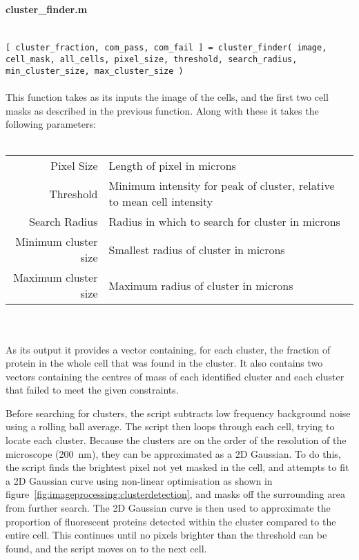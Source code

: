 \documentclass[../main.tex]{subfiles}
\begin{document}
\paragraph{cluster\_finder.m}\ \\
\texttt{[ cluster\_fraction, com\_pass, com\_fail ] = cluster\_finder( image, cell\_mask, all\_cells, pixel\_size, threshold, search\_radius, min\_cluster\_size, max\_cluster\_size ) }
\\\\
This function takes as its inputs the image of the cells, and the first two cell masks as described in the previous function. Along with these it takes the following parameters:
\\\\
\begin{tabular}{rl}
Pixel Size		&	Length of pixel in microns\\
Threshold		&	Minimum intensity for peak of cluster, relative to mean cell intensity\\
Search Radius 	&	Radius in which to search for cluster in microns\\
Minimum cluster size	&	Smallest radius of cluster in microns\\
Maximum cluster size	&	Maximum radius of cluster in microns
\end{tabular}
\\\\
As its output it provides a vector containing, for each cluster, the fraction of protein in the whole cell that was found in the cluster. It also contains two vectors containing the centres of mass of each identified cluster and each cluster that failed to meet the given constraints.

Before searching for clusters, the script subtracts low frequency background noise using a rolling ball average. The script then loops through each cell, trying to locate each cluster. Because the clusters are on the order of the resolution of the microscope (\SI{200}{\nano\meter}), they can be approximated as a 2D Gaussian. To do this, the script finds the brightest pixel not yet masked in the cell, and attempts to fit a 2D Gaussian curve using non-linear optimisation as shown in figure~\ref{fig:imageprocessing:clusterdetection}, and masks off the surrounding area from further search. The 2D Gaussian curve is then used to approximate the proportion of fluorescent proteins detected within the cluster compared to the entire cell. This continues until no pixels brighter than the threshold can be found, and the script moves on to the next cell.
\end{document}
